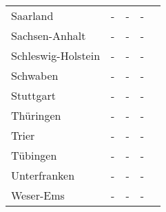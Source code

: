 \begin{table}[H]
\begin{tabularx}{\textwidth}{Xcccc}
            Saarland & - & - & - \\
            Sachsen-Anhalt & - & - & - \\
            Schleswig-Holstein & - & - & - \\
            Schwaben & - & - & - \\
            Stuttgart & - & - & - \\
            Thüringen & - & - & - \\
            Trier & - & - & - \\
            Tübingen & - & - & - \\
            Unterfranken & - & - & - \\
            Weser-Ems & - & - & - \\
        \bottomrule
    \end{tabularx}
\end{table}
    